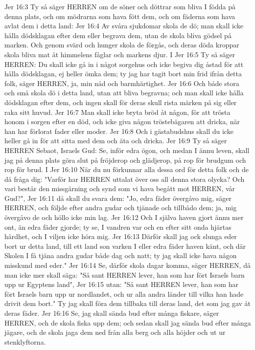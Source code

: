Jer 16:3  Ty så säger HERREN om de söner och döttrar som bliva I födda på denna plats, och om mödrarna som hava fött dem, och om fäderna som hava avlat dem i detta land:
Jer 16:4  Av svåra sjukdomar skola de dö; man skall icke hålla dödsklagan efter dem eller begrava dem, utan de skola bliva gödsel på marken. Och genom svärd och hunger skola de förgås, och deras döda kroppar skola bliva mat åt himmelens fåglar och markens djur. I
Jer 16:5  Ty så säger HERREN: Du skall icke gå in i något sorgehus och icke begiva dig åstad för att hålla dödsklagan, ej heller ömka dem; ty jag har tagit bort min frid ifrån detta folk, säger HERREN, ja, min nåd och barmhärtighet.
Jer 16:6  Och både stora och små skola dö i detta land, utan att bliva begravna; och man skall icke hålla dödsklagan efter dem, och ingen skall för deras skull rista märken på sig eller raka sitt huvud.
Jer 16:7  Man skall icke bryta bröd åt någon, för att trösta honom i sorgen efter en död, och icke giva någon tröstebägaren att dricka, när han har förlorat fader eller moder.
Jer 16:8  Och i gästabudshus skall du icke heller gå in för att sitta med dem och äta och dricka.
Jer 16:9  Ty så säger HERREN Sebaot, Israels Gud: Se, inför edra ögon, och medan I ännu leven, skall jag på denna plats göra slut på fröjderop och glädjerop, på rop för brudgum och rop för brud. I
Jer 16:10  När du nu förkunnar alla dessa ord för detta folk och de då fråga dig: "Varför har HERREN uttalat över oss all denna stora olycka? Och vari består den missgärning och synd som vi hava begått mot HERREN, vår Gud?",
Jer 16:11  då skall du svara dem: "Jo, edra fäder övergåvo mig, säger HERREN, och följde efter andra gudar och tjänade och tillbådo dem; ja, mig övergåvo de och höllo icke min lag.
Jer 16:12  Och I själva haven gjort ännu mer ont, än edra fäder gjorde; ty se, I vandren var och en efter sitt onda hjärtas hårdhet, och I viljen icke höra mig.
Jer 16:13  Därför skall jag ock slunga eder bort ur detta land, till ett land son varken I eller edra fäder haven känt, och där Skolen I få tjäna andra gudar både dag och natt; ty jag skall icke hava någon misskund med eder."
Jer 16:14  Se, därför skola dagar komma, säger HERREN, då man icke mer skall säga: "Så sant HERREN lever, han som har fört Israels barn upp ur Egyptens land",
Jer 16:15  utan: "Så sant HERREN lever, han som har fört Israels barn upp ur nordlandet, och ur alla andra länder till vilka han hade drivit dem bort." Ty jag skall föra dem tillbaka till deras land, det som jag gav åt deras fäder.
Jer 16:16  Se, jag skall sända bud efter många fiskare, säger HERREN, och de skola fiska upp dem; och sedan skall jag sända bud efter många jägare, och de skola jaga dem ned från alla berg och alla höjder och ut ur stenklyftorna.
